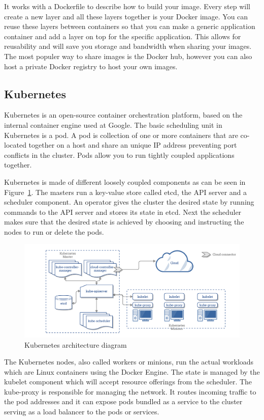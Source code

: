 It works with a Dockerfile to describe how to build your image. Every step will create a new layer and all these layers together is your Docker image. You can reuse these layers between containers so that you can make a generic application container and add a layer on top for the specific application. This allows for reusability and will save you storage and bandwidth when sharing your images. The most populer way to share images is the Docker hub, however you can also host a private Docker registry to host your own images.

\subsection{Kubernetes}
Kubernetes is an open-source container orchestration platform, based on the internal container engine used at Google. The basic scheduling unit in Kubernetes is a pod. A pod is collection of one or more containers that are co-located together on a host and share an unique IP address preventing port conflicts in the cluster. Pods allow you to run tightly coupled applications together.

Kubernetes is made of different loosely coupled components as can be seen in Figure~\ref{fig:k8s-arch}. The masters run a key-value store called etcd\cite{etcd}, the API server and a scheduler component. An operator gives the cluster the desired state by running commands to the API server and stores its state in etcd. Next the scheduler makes sure that the desired state is achieved by choosing and instructing the nodes to run or delete the pods.

\begin{figure}
    \centering
    \includegraphics[width=1\columnwidth]{images/k8s-arch}
    \caption{Kubernetes architecture diagram\cite{k8s_arch}}
    \label{fig:k8s-arch}
\end{figure}

The Kubernetes nodes, also called workers or minions, run the actual workloads which are Linux containers using the Docker Engine. The state is managed by the kubelet component which will accept resource offerings from the scheduler. The kube-proxy is responsible for managing the network. It routes incoming traffic to the pod addresses and it can expose pods bundled as a service to the cluster serving as a load balancer to the pods or services. 

